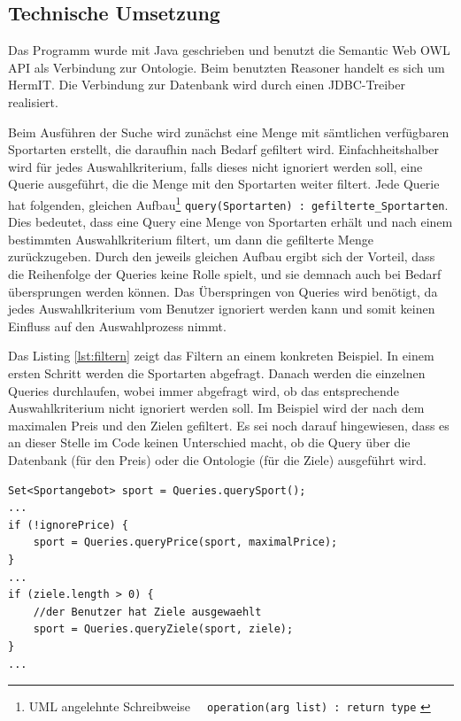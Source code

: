 \subsection{Technische Umsetzung}
Das Programm wurde mit Java geschrieben und benutzt die Semantic Web OWL API \autocite{semweb:owlapi} als Verbindung zur Ontologie. Beim benutzten Reasoner handelt es sich um HermIT\autocite{krr:hermit}. Die Verbindung zur Datenbank wird durch einen JDBC-Treiber\autocite{oracle:jdbc} realisiert.

Beim Ausführen der Suche wird zunächst eine Menge mit sämtlichen verfügbaren Sportarten erstellt, die daraufhin nach Bedarf gefiltert wird. Einfachheitshalber wird für jedes Auswahlkriterium, falls dieses nicht ignoriert werden soll, eine Querie ausgeführt, die die Menge mit den Sportarten weiter filtert. Jede Querie hat folgenden, gleichen Aufbau\footnote{UML angelehnte Schreibweise \lstinline"  operation(arg list) : return type" \autocite{kow:umlclass}} \lstinline"query(Sportarten) : gefilterte_Sportarten". Dies bedeutet, dass eine Query eine Menge von Sportarten erhält und nach einem bestimmten Auswahlkriterium filtert, um dann die gefilterte Menge zurückzugeben. Durch den jeweils gleichen Aufbau ergibt sich der Vorteil, dass die Reihenfolge der Queries keine Rolle spielt, und sie demnach auch bei Bedarf übersprungen werden können. Das Überspringen von Queries wird benötigt, da jedes Auswahlkriterium vom Benutzer ignoriert werden kann und somit keinen Einfluss auf den Auswahlprozess nimmt.

Das Listing \ref{lst:filtern} zeigt das Filtern an einem konkreten Beispiel. In einem ersten Schritt werden die Sportarten abgefragt. Danach werden die einzelnen Queries durchlaufen, wobei immer abgefragt wird, ob das entsprechende Auswahlkriterium nicht ignoriert werden soll. Im Beispiel wird der nach dem maximalen Preis und den Zielen gefiltert. Es sei noch darauf hingewiesen, dass es an dieser Stelle im Code keinen Unterschied macht, ob die Query über die Datenbank (für den Preis) oder die Ontologie (für die Ziele) ausgeführt wird. 

\begin{lstlisting}[caption=Filtern von Sportarten, label=lst:filtern]
Set<Sportangebot> sport = Queries.querySport();
...        
if (!ignorePrice) {
	sport = Queries.queryPrice(sport, maximalPrice);
}
...
if (ziele.length > 0) {
	//der Benutzer hat Ziele ausgewaehlt
	sport = Queries.queryZiele(sport, ziele);
}
...                
\end{lstlisting}

